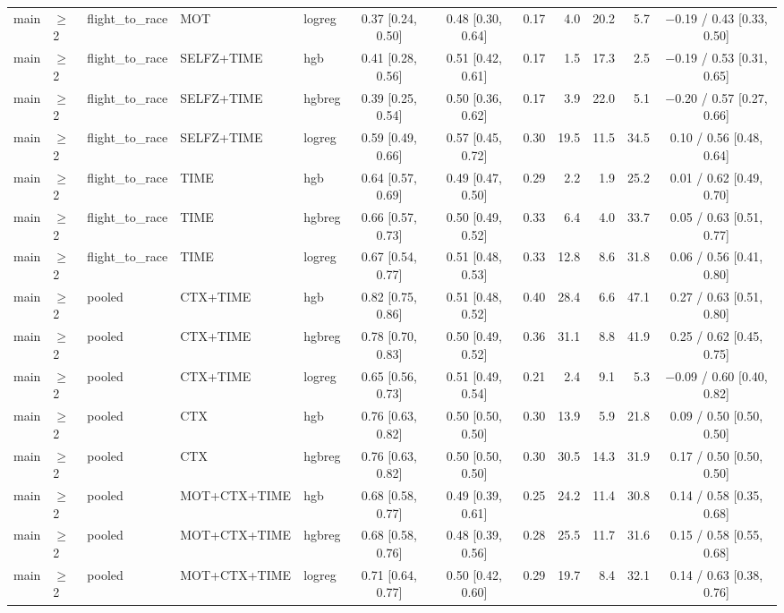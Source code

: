 \begin{longtable}{@{}lllllcccrrrc@{}}
main & $\geq$2 & flight\_to\_race & MOT & logreg & 0.37 [0.24, 0.50] & 0.48 [0.30, 0.64] & 0.17 & 4.0 & 20.2 & 5.7 & $-$0.19 / 0.43 [0.33, 0.50] \\
main & $\geq$2 & flight\_to\_race & SELFZ+TIME & hgb & 0.41 [0.28, 0.56] & 0.51 [0.42, 0.61] & 0.17 & 1.5 & 17.3 & 2.5 & $-$0.19 / 0.53 [0.31, 0.65] \\
main & $\geq$2 & flight\_to\_race & SELFZ+TIME & hgbreg & 0.39 [0.25, 0.54] & 0.50 [0.36, 0.62] & 0.17 & 3.9 & 22.0 & 5.1 & $-$0.20 / 0.57 [0.27, 0.66] \\
main & $\geq$2 & flight\_to\_race & SELFZ+TIME & logreg & 0.59 [0.49, 0.66] & 0.57 [0.45, 0.72] & 0.30 & 19.5 & 11.5 & 34.5 & 0.10 / 0.56 [0.48, 0.64] \\
main & $\geq$2 & flight\_to\_race & TIME & hgb & 0.64 [0.57, 0.69] & 0.49 [0.47, 0.50] & 0.29 & 2.2 & 1.9 & 25.2 & 0.01 / 0.62 [0.49, 0.70] \\
main & $\geq$2 & flight\_to\_race & TIME & hgbreg & 0.66 [0.57, 0.73] & 0.50 [0.49, 0.52] & 0.33 & 6.4 & 4.0 & 33.7 & 0.05 / 0.63 [0.51, 0.77] \\
main & $\geq$2 & flight\_to\_race & TIME & logreg & 0.67 [0.54, 0.77] & 0.51 [0.48, 0.53] & 0.33 & 12.8 & 8.6 & 31.8 & 0.06 / 0.56 [0.41, 0.80] \\
main & $\geq$2 & pooled & CTX+TIME & hgb & 0.82 [0.75, 0.86] & 0.51 [0.48, 0.52] & 0.40 & 28.4 & 6.6 & 47.1 & 0.27 / 0.63 [0.51, 0.80] \\
main & $\geq$2 & pooled & CTX+TIME & hgbreg & 0.78 [0.70, 0.83] & 0.50 [0.49, 0.52] & 0.36 & 31.1 & 8.8 & 41.9 & 0.25 / 0.62 [0.45, 0.75] \\
main & $\geq$2 & pooled & CTX+TIME & logreg & 0.65 [0.56, 0.73] & 0.51 [0.49, 0.54] & 0.21 & 2.4 & 9.1 & 5.3 & $-$0.09 / 0.60 [0.40, 0.82] \\
main & $\geq$2 & pooled & CTX & hgb & 0.76 [0.63, 0.82] & 0.50 [0.50, 0.50] & 0.30 & 13.9 & 5.9 & 21.8 & 0.09 / 0.50 [0.50, 0.50] \\
main & $\geq$2 & pooled & CTX & hgbreg & 0.76 [0.63, 0.82] & 0.50 [0.50, 0.50] & 0.30 & 30.5 & 14.3 & 31.9 & 0.17 / 0.50 [0.50, 0.50] \\
main & $\geq$2 & pooled & MOT+CTX+TIME & hgb & 0.68 [0.58, 0.77] & 0.49 [0.39, 0.61] & 0.25 & 24.2 & 11.4 & 30.8 & 0.14 / 0.58 [0.35, 0.68] \\
main & $\geq$2 & pooled & MOT+CTX+TIME & hgbreg & 0.68 [0.58, 0.76] & 0.48 [0.39, 0.56] & 0.28 & 25.5 & 11.7 & 31.6 & 0.15 / 0.58 [0.55, 0.68] \\
main & $\geq$2 & pooled & MOT+CTX+TIME & logreg & 0.71 [0.64, 0.77] & 0.50 [0.42, 0.60] & 0.29 & 19.7 & 8.4 & 32.1 & 0.14 / 0.63 [0.38, 0.76] \\

\end{longtable}

